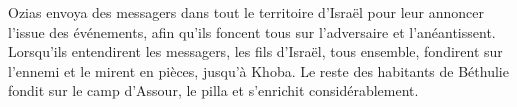 Ozias envoya des messagers dans tout le territoire d'Israël
		pour leur annoncer l'issue des événements,
	afin qu'ils foncent tous sur l'adversaire et l'anéantissent.
Lorsqu'ils entendirent les messagers,
	les fils d'Israël, tous ensemble, fondirent sur l'ennemi
	et le mirent en pièces, jusqu'à Khoba.
Le reste des habitants de Béthulie fondit sur le camp d'Assour,
	le pilla et s'enrichit considérablement.
